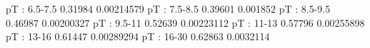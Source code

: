 pT : 6.5-7.5
0.31984 0.00214579
pT : 7.5-8.5
0.39601 0.001852
pT : 8.5-9.5
0.46987 0.00200327
pT : 9.5-11
0.52639 0.00223112
pT : 11-13
0.57796 0.00255898
pT : 13-16
0.61447 0.00289294
pT : 16-30
0.62863 0.0032114

